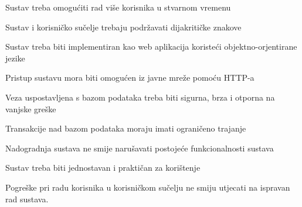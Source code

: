 			
	\begin{packed_item}
	
		\item {Sustav treba omogućiti rad više korisnika u stvarnom vremenu}
		\item {Sustav i korisničko sučelje trebaju podržavati dijakritičke znakove}	
		\item {Sustav treba biti implementiran kao web aplikacija koristeći objektno-orjentirane jezike}
		\item {Pristup sustavu mora biti omogućen iz javne mreže pomoću HTTP-a}
		\item {Veza uspostavljena s bazom podataka treba biti sigurna, brza i otporna na vanjske greške}
		\item {Transakcije nad bazom podataka moraju imati ograničeno trajanje}
		\item {Nadogradnja sustava ne smije narušavati postojeće funkcionalnosti sustava}
		\item {Sustav treba biti jednostavan i praktičan za korištenje}
		\item {Pogreške pri radu korisnika u korisničkom sučelju  ne smiju utjecati na ispravan rad sustava.}
	
	\end{packed_item}
		 	 
			 
			 
	